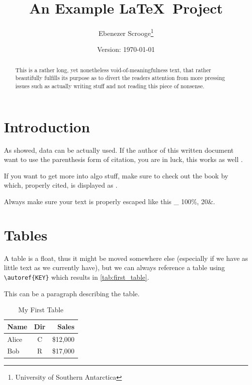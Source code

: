 \documentclass[12pt,a4paper]{article}
\title{An Example \LaTeX\ Project}
\author{Ebenezer Scrooge\thanks{University of Southern Antarctica}}
\date{Version: \today}
\begin{document}
	\maketitle
	
	\begin{abstract}
		This is a rather long, yet nonetheless void-of-meaningfulness text, that rather beautifully fulfills its purpose as to divert the readers attention from more pressing issues such as actually writing stuff and not reading this piece of nonsense.
	\end{abstract}

	\tableofcontents
	\listoffigures
	\listoftables
	\newpage

\section{Introduction}
	
	As \textcite{Friedman2001} showed, data can be actually used. If the author of this written document want to use the parenthesis form of citation, you are in luck, this works as well \parencite{Friedman2001a}.
	
	If you want to get more into algo stuff, make sure to check out the book by \citeauthor{Gareth2013} which, properly cited, is displayed as \textcite{Gareth2013}.
	
	Always make sure your text is properly escaped like this \_ 100\%, 20\&.
	
\section{Tables}
	
	A table is a float, thus it might be moved somewhere else (especially if we have as little text as we currently have), but we can always reference a table using \verb|\autoref{KEY}| which results in \autoref{tab:first_table}.
	
	\begin{table}
		\caption{My First Table}
		\label{tab:first_table}
		\centering
		{\scriptsize This can be a paragraph describing the table.\par}
		\begin{tabular}{lcr}
			\hline 
			Name & Dir & Sales \\
			\hline
			Alice & C & \$12,000\\
			Bob & R & \$17,000\\
			\hline
		\end{tabular}
	\end{table}
\end{document}
